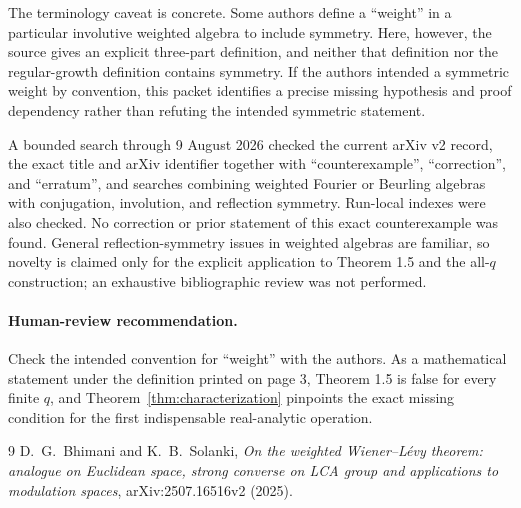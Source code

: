 \documentclass[11pt]{article}
\begin{document}
The terminology caveat is concrete.  Some authors define a ``weight'' in a
particular involutive weighted algebra to include symmetry.  Here, however,
the source gives an explicit three-part definition, and neither that
definition nor the regular-growth definition contains symmetry.  If the
authors intended a symmetric weight by convention, this packet identifies
a precise missing hypothesis and proof dependency rather than refuting the
intended symmetric statement.

A bounded search through 9 August 2026 checked the current arXiv v2 record,
the exact title and arXiv identifier together with ``counterexample'',
``correction'', and ``erratum'', and searches combining weighted Fourier or
Beurling algebras with conjugation, involution, and reflection symmetry.
Run-local indexes were also checked.  No correction or prior statement of
this exact counterexample was found.  General reflection-symmetry issues in
weighted algebras are familiar, so novelty is claimed only for the explicit
application to Theorem 1.5 and the all-$q$ construction; an exhaustive
bibliographic review was not performed.

\paragraph{Human-review recommendation.}
Check the intended convention for ``weight'' with the authors.  As a
mathematical statement under the definition printed on page 3, Theorem 1.5
is false for every finite $q$, and Theorem~\ref{thm:characterization}
pinpoints the exact missing condition for the first indispensable
real-analytic operation.

\begin{thebibliography}{9}
D.~G.~Bhimani and K.~B.~Solanki,
\emph{On the weighted Wiener--L\'evy theorem: analogue on Euclidean space,
strong converse on LCA group and applications to modulation spaces},
arXiv:2507.16516v2 (2025).
\end{thebibliography}
\end{document}
